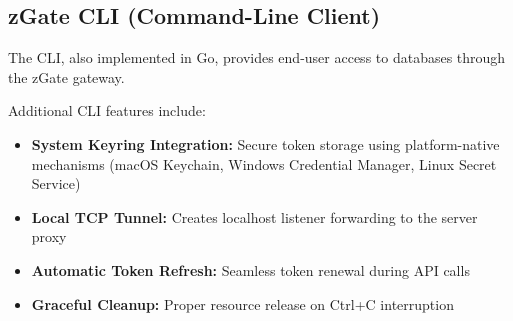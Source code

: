 
\subsection{zGate CLI (Command-Line Client)}

The CLI, also implemented in Go, provides end-user access to databases through the zGate gateway.

\begin{table}[h]
\centering
{}
\caption{CLI Commands and Features}
\label{tab:cli-features}
\end{table}

Additional CLI features include:

\begin{itemize}
    \item \textbf{System Keyring Integration:} Secure token storage using platform-native mechanisms (macOS Keychain, Windows Credential Manager, Linux Secret Service)
    \item \textbf{Local TCP Tunnel:} Creates localhost listener forwarding to the server proxy
    \item \textbf{Automatic Token Refresh:} Seamless token renewal during API calls
    \item \textbf{Graceful Cleanup:} Proper resource release on Ctrl+C interruption
\end{itemize}

